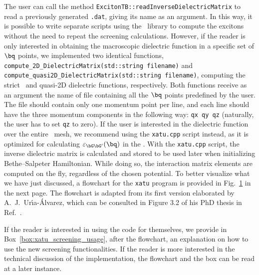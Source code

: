 The user can call the method \texttt{ExcitonTB::readInverseDielectricMatrix} to read a previously generated \texttt{.dat}, giving its name as an argument.
In this way, it is possible to write separate scripts using the \xatu~library to compute the excitons without the need to repeat the screening calculations.
However, if the reader is only interested in obtaining the macroscopic dielectric function in a specific set of $\bq$ points, we implemented two identical functions, \texttt{compute\_2D\_DielectricMatrix(std::string filename)} and \texttt{compute\_quasi2D\_DielectricMatrix(std::string filename)}, computing the strict \bd~and quasi-2D dielectric functions, respectively.
Both functions receive as an argument the name of file containing all the $\bq$ points predefined by the user.
The file should contain only one momentum point per line, and each line should have the three momentum components in the following way: \texttt{qx qy qz} (naturally, the user has to set \texttt{qz} to zero).
If the user is interested in the dielectric function over the entire \bz~mesh, we recommend using the \texttt{xatu.cpp} script instead, as it is optimized for calculating $\varepsilon_{\bG \bG'}(\bq)$ in the \bz\@.
With the \texttt{xatu.cpp} script, the inverse dielectric matrix is calculated and stored to be used later when initializing Bethe--Salpeter Hamiltonian.
While doing so, the interaction matrix elements are computed on the fly, regardless of the chosen potential.
To better visualize what we have just discussed, a flowchart for the \texttt{xatu} program is provided in Fig.~\ref{fig:xatu_flow_diagram} in the next page.
The flowchart is adapted from its first version elaborated by A.~J.~Ur\'{\i}a-\'Alvarez, which can be consulted in Figure 3.2 of his PhD thesis in Ref.~\cite{Alex_PhD}.

If the reader is interested in using the code for themselves, we provide in Box~\ref{box:xatu_screening_usage}, after the flowchart, an explanation on how to use the new screening functionalities.
If the reader is more interested in the technical discussion of the implementation, the flowchart and the box can be read at a later instance.

\clearpage

\begin{figure}[h!]
    
    \label{fig:xatu_flow_diagram}
\end{figure}

